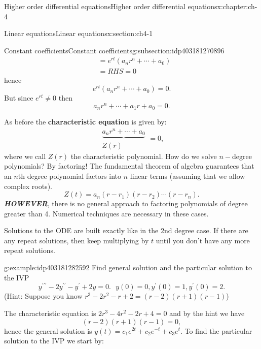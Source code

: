 \documentclass[oneside,10pt,]{book}
\newcommand{\alert}[1]{\textbf{\textit{#1}}}
\newcommand{\terminology}[1]{\textbf{#1}}
\numberwithin{equation}{section}
\numberwithin{equation}{section}
\newcommand{\amp}{&}
\begin{document}
\begin{chapterptx}{Higher order differential equations}{}{Higher order differential equations}{}{}{x:chapter:ch-4}
\begin{sectionptx}{Linear equations}{}{Linear equations}{}{}{x:section:ch4-1}
\begin{subsectionptx}{Constant coefficients}{}{Constant coefficients}{}{}{g:subsection:idp403181270896}
\begin{align*}
\amp =e^{rt}\left(a_{n}r^{n}+\cdots+a_{0}\right)\\
\amp =RHS=0
\end{align*}
hence%
\begin{equation*}
e^{rt}\left(a_{n}r^{n}+\cdots+a_{0}\right)=0.
\end{equation*}
But since \(e^{rt}\neq0\) then%
\begin{equation*}
a_{n}r^{n}+\cdots+a_{1}r+a_{0}=0.
\end{equation*}
%
\par
As before the \terminology{characteristic equation} is given by:%
\begin{equation*}
\begin{array}{c}
\underbrace{a_{n}r^{n}+\cdots+a_{0}}\\
Z(r)
\end{array}=0,
\end{equation*}
where we call \(Z(r)\) the characteristic polynomial. How do we solve \(n-\)degree polynomials? By factoring! The fundamental theorem of algebra guarantees that an \(n\)th degree polynomial factors into \(n\) linear terms (assuming that we allow complex roots).%
\begin{equation*}
Z(t)=a_{n}\left(r-r_{1}\right)\left(r-r_{2}\right)\cdots\left(r-r_{n}\right).
\end{equation*}
\alert{HOWEVER}, there is no general approach to factoring polynomials of degree greater than 4. Numerical techniques are necessary in these cases.%
\par
Solutions to the ODE are built exactly like in the 2nd degree case. If there are any repeat solutions, then keep multiplying by \(t\) until you don't have any more repeat solutions.%
\begin{example}{}{g:example:idp403181282592}%
Find general solution and the particular solution to the IVP%
\begin{equation*}
y^{\prime\prime\prime}-2y^{\prime\prime}-y^{\prime}+2y=0.\,\,\,\,y(0)=0,y^{\prime}(0)=1,y^{\prime}(0)=2.
\end{equation*}
(Hint: Suppose you know \(r^{3}-2r^{2}-r+2=\left(r-2\right)\left(r+1\right)\left(r-1\right)\))%
\par
The characteristic equation is \(2r^{3}-4r^{2}-2r+4=0\) and by the hint we have%
\begin{equation*}
\left(r-2\right)\left(r+1\right)\left(r-1\right)=0,
\end{equation*}
hence the general solution is \(y(t)=c_{1}e^{2t}+c_{2}e^{-t}+c_{3}e^{t}\). To find the particular solution to the IVP we start by:%

\end{example}
\end{subsectionptx}
\end{sectionptx}
\end{chapterptx}
\end{document}
